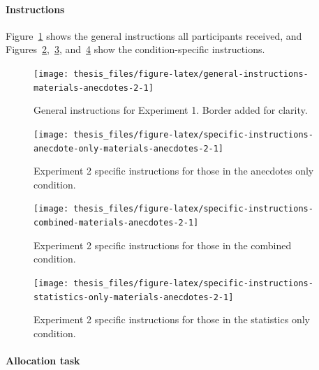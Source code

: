 \documentclass[a4paper, nobind, dvipsnames]{templates/ociamthesis}
\theoremstyle{definition}
\theoremstyle{definition}
\theoremstyle{definition}
\theoremstyle{definition}
\theoremstyle{remark}
\begin{document}
\hypertarget{instructions-materials-anecdotes-2-appendix}{%
\paragraph{Instructions}\label{instructions-materials-anecdotes-2-appendix}}

Figure~\ref{fig:general-instructions-materials-anecdotes-2} shows the general
instructions all participants received, and
Figures~\ref{fig:specific-instructions-anecdote-only-materials-anecdotes-2},~\ref{fig:specific-instructions-combined-materials-anecdotes-2},
and~\ref{fig:specific-instructions-statistics-only-materials-anecdotes-2} show
the condition-specific instructions.



\begin{figure}
\texttt{[image: thesis\_files/figure-latex/general-instructions-materials-anecdotes-2-1]} \caption{General instructions for Experiment 1. Border added for clarity.}\label{fig:general-instructions-materials-anecdotes-2}
\end{figure}



\begin{figure}
\texttt{[image: thesis\_files/figure-latex/specific-instructions-anecdote-only-materials-anecdotes-2-1]} \caption{Experiment 2 specific instructions for those in the anecdotes only condition.}\label{fig:specific-instructions-anecdote-only-materials-anecdotes-2}
\end{figure}



\begin{figure}
\texttt{[image: thesis\_files/figure-latex/specific-instructions-combined-materials-anecdotes-2-1]} \caption{Experiment 2 specific instructions for those in the combined condition.}\label{fig:specific-instructions-combined-materials-anecdotes-2}
\end{figure}



\begin{figure}
\texttt{[image: thesis\_files/figure-latex/specific-instructions-statistics-only-materials-anecdotes-2-1]} \caption{Experiment 2 specific instructions for those in the statistics only condition.}\label{fig:specific-instructions-statistics-only-materials-anecdotes-2}
\end{figure}

\hypertarget{allocation-anecdotes-2-appendix}{%
\paragraph{Allocation task}\label{allocation-anecdotes-2-appendix}}
\end{document}
